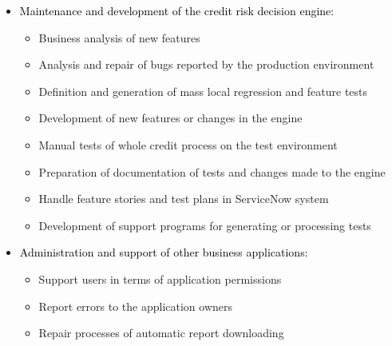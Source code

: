 \documentclass[10pt,a4paper,ragged2e,withhyper]{altacv}
\begin{document}

\begin{paracol}{2}


\makecvheader






\begin{itemize}
\item \textcolor{black}{Maintenance and development of the credit risk decision engine:}
\begin{itemize}
    \item Business analysis of new features
    \item Analysis and repair of bugs reported by the production environment
    \item Definition and generation of mass local regression and feature tests
    \item Development of new features or changes in the engine
    \item Manual tests of whole credit process on the test environment
    \item Preparation of documentation of tests and changes made to the engine
    \item Handle feature stories and test plans in ServiceNow system
    \item Development of support programs for generating or processing tests
\end{itemize}
\item \textcolor{black}{Administration and support of other business applications:}
\begin{itemize}
    \item Support users in terms of application permissions
    \item Report errors to the application owners
    \item Repair processes of automatic report downloading
\end{itemize}
\end{itemize}


\end{paracol}
\end{document}
